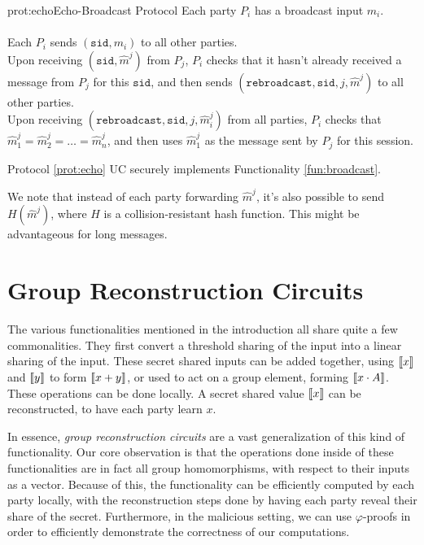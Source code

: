 \begin{aprotocol}{prot:echo}{Echo-Broadcast Protocol}
Each party $P_i$ has a broadcast input $m_i$.\\
\\
Each $P_i$ sends $(\texttt{sid}, m_i)$ to all other parties.\\
Upon receiving $(\texttt{sid}, \hat{m}^j)$ from $P_j$, $P_i$ checks that
it hasn't already received a message from $P_j$ for this $\texttt{sid}$,
and then sends $(\texttt{rebroadcast}, \texttt{sid}, j, \hat{m}^j)$ to all other parties.\\
Upon receiving $(\texttt{rebroadcast}, \texttt{sid}, j, \hat{m}_i^j)$ from all
parties, $P_i$ checks that $\hat{m}_1^j = \hat{m}_2^j = \ldots = \hat{m}^j_n$,
and then uses $\hat{m}^j_1$ as the message sent by $P_j$ for this session.
\end{aprotocol}

Protocol \ref{prot:echo} UC securely implements Functionality \ref{fun:broadcast}.

We note that instead of each party forwarding $\hat{m}^j$, it's also possible
to send $H(\hat{m}^j)$, where $H$ is a collision-resistant hash function.
This might be advantageous for long messages.

\section{Group Reconstruction Circuits}

The various functionalities mentioned in the introduction
all share quite a few commonalities. They first convert
a threshold sharing of the input into a linear sharing of the input.
These secret shared inputs can be added together, using $\llbracket x\rrbracket$ and $\llbracket y\rrbracket$
to form $\llbracket x + y\rrbracket$, or used to act on a group element, forming
$\llbracket x \cdot A\rrbracket$. These operations can be done locally.
A secret shared value $\llbracket x\rrbracket$ can be reconstructed, to have each party learn $x$.

In essence, \emph{group reconstruction circuits} are a vast generalization
of this kind of functionality. Our core observation is that the operations
done inside of these functionalities are in fact all group homomorphisms,
with respect to their inputs as a vector. Because of this, the functionality
can be efficiently computed by each party locally, with the reconstruction
steps done by having each party reveal their share of the secret.
Furthermore, in the malicious setting, we can use $\varphi$-proofs in
order to efficiently demonstrate the correctness of our computations.

